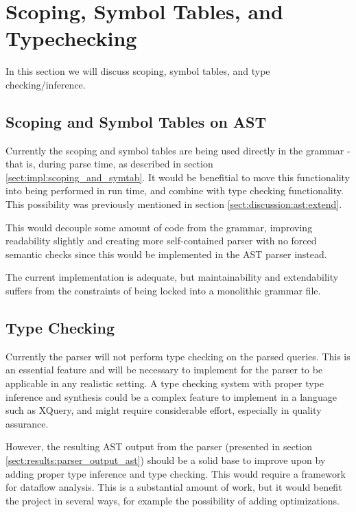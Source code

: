 \section{Scoping, Symbol Tables, and Typechecking}
In this section we will discuss scoping, symbol tables, and type
checking/inference.

\subsection{Scoping and Symbol Tables on AST}
Currently the scoping and symbol tables are being used directly in the grammar -
that is, during parse time, as described in section
\ref{sect:impl:scoping_and_symtab}. It would be benefitial to move this
functionality into being performed in run time, and combine with type checking
functionality. This possibility was previously mentioned in section
\ref{sect:discussion:ast:extend}.

This would decouple some amount of code from the grammar, improving readability
slightly and creating more self-contained parser with no forced semantic checks
since this would be implemented in the AST parser instead.

The current implementation is adequate, but maintainability and extendability
suffers from the constraints of being locked into a monolithic grammar file.

\subsection{Type Checking}
Currently the parser will not perform type checking on the parsed queries. This
is an essential feature and will be necessary to implement for the parser to be
applicable in any realistic setting. A type checking system with proper type
inference and synthesis could be a complex feature to implement in a language
such as XQuery, and might require considerable effort, especially in quality
assurance. 

However, the resulting AST output from the parser (presented in section
\ref{sect:results:parser_output_ast}) should be a solid base to improve upon by
adding proper type inference and type checking. This would require a framework
for dataflow analysis. This is a substantial amount of work, but it would
benefit the project in several ways, for example the possibility of adding
optimizations.